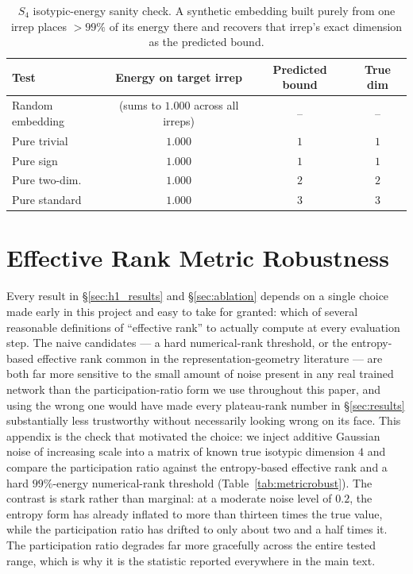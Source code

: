 \documentclass{article}
\begin{document}
\begin{table}[h]
\caption{$S_4$ isotypic-energy sanity check. A synthetic embedding built
purely from one irrep places $>99\%$ of its energy there and recovers that
irrep's exact dimension as the predicted bound.}
\label{tab:s4sanity}
\centering
\small
\begin{tabular}{@{}lccc@{}}
\toprule
Test & Energy on target irrep & Predicted bound & True dim \\
\midrule
Random embedding & (sums to $1.000$ across all irreps) & -- & -- \\
Pure trivial & $1.000$ & $1$ & $1$ \\
Pure sign & $1.000$ & $1$ & $1$ \\
Pure two-dim.\ & $1.000$ & $2$ & $2$ \\
Pure standard & $1.000$ & $3$ & $3$ \\
\bottomrule
\end{tabular}
\end{table}

\FloatBarrier
\section{Effective Rank Metric Robustness}
\label{app:metric_robustness}

Every result in \S\ref{sec:h1_results} and \S\ref{sec:ablation} depends
on a single choice made early in this project and easy to take for
granted: which of several reasonable definitions of ``effective rank'' to
actually compute at every evaluation step. The naive candidates --- a hard
numerical-rank threshold, or the entropy-based effective rank common in
the representation-geometry literature --- are both far more sensitive to
the small amount of noise present in any real trained network than the
participation-ratio form we use throughout this paper, and using the
wrong one would have made every plateau-rank number in
\S\ref{sec:results} substantially less trustworthy without necessarily
looking wrong on its face. This appendix is the check that motivated the
choice: we inject additive Gaussian noise of increasing scale into a
matrix of known true isotypic dimension $4$ and compare the participation
ratio against the entropy-based effective rank and a hard $99\%$-energy
numerical-rank threshold (Table~\ref{tab:metricrobust}). The contrast is
stark rather than marginal: at a moderate noise level of $0.2$, the
entropy form has already inflated to more than thirteen times the true
value, while the participation ratio has drifted to only about two and a
half times it. The participation ratio degrades far more gracefully across
the entire tested range, which is why it is the statistic reported
everywhere in the main text.
\end{document}
